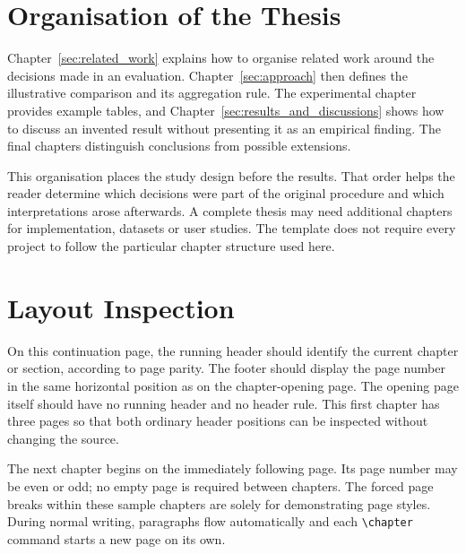 \section{Organisation of the Thesis}
Chapter~\ref{sec:related_work} explains how to organise related work around the
decisions made in an evaluation. Chapter~\ref{sec:approach} then defines the
illustrative comparison and its aggregation rule. The experimental chapter
provides example tables, and Chapter~\ref{sec:results_and_discussions} shows how
to discuss an invented result without presenting it as an empirical finding.
The final chapters distinguish conclusions from possible extensions.

This organisation places the study design before the results. That order helps
the reader determine which decisions were part of the original procedure and
which interpretations arose afterwards. A complete thesis may need additional
chapters for implementation, datasets or user studies. The template does not
require every project to follow the particular chapter structure used here.

\section{Layout Inspection}
On this continuation page, the running header should identify the current
chapter or section, according to page parity. The footer should display the
page number in the same horizontal position as on the chapter-opening page.
The opening page itself should have no running header and no header rule.
This first chapter has three pages so that both ordinary header positions can
be inspected without changing the source.

The next chapter begins on the immediately following page. Its page number
may be even or odd; no empty page is required between chapters. The forced
page breaks within these sample chapters are solely for demonstrating page
styles. During normal writing, paragraphs flow automatically and each
\verb|\chapter| command starts a new page on its own.
